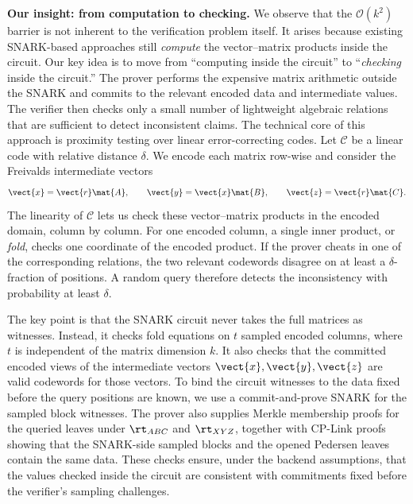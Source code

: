 \noindent\textbf{Our insight: from computation to checking.}
We observe that the \(\mathcal{O}(k^2)\) barrier is not inherent to the
verification problem itself.  It arises because existing SNARK-based approaches
still \emph{compute} the vector--matrix products inside the circuit.  Our key
idea is to move from ``computing inside the circuit'' to ``\emph{checking} inside the
circuit.''  The prover performs the expensive matrix arithmetic outside the
SNARK and commits to the relevant encoded data and intermediate values.  The
verifier then checks only a small number of lightweight algebraic relations
that are sufficient to detect inconsistent claims.
The technical core of this approach is proximity testing over linear
error-correcting codes.  Let \(\mathcal{C}\) be a linear code with relative
distance \(\delta\).  We encode each matrix row-wise and consider the Freivalds
intermediate vectors
\[
  \vect{x}=\vect{r}\mat{A},\qquad
  \vect{y}=\vect{x}\mat{B},\qquad
  \vect{z}=\vect{r}\mat{C}.
\]
The linearity of \(\mathcal{C}\) lets us check these vector--matrix products in
the encoded domain, column by column.  For one encoded column, a single inner
product, or \emph{fold}, checks one coordinate of the encoded product.  If the
prover cheats in one of the corresponding relations, the two relevant
codewords disagree on at least a \(\delta\)-fraction of positions.  A random
query therefore detects the inconsistency with probability at least \(\delta\).

The key point is that the SNARK circuit never takes the full matrices as witnesses.  Instead, it checks fold equations on \(t\) sampled encoded columns, where \(t\) is independent of the matrix dimension \(k\).  It also checks that the committed encoded views of the intermediate vectors \(\vect{x},\vect{y},\vect{z}\) are valid codewords for those vectors.  
To bind the circuit witnesses to the data fixed before the query positions are known,
we use a commit-and-prove SNARK for the sampled block witnesses.  The prover
also supplies Merkle membership proofs for the queried leaves under
\(\rt_{ABC}\) and \(\rt_{XYZ}\), together with CP-Link proofs showing that the
SNARK-side sampled blocks and the opened Pedersen leaves contain the same data.
These checks ensure, under the backend assumptions, that the values checked
inside the circuit are consistent with commitments fixed before the verifier's
sampling challenges.


